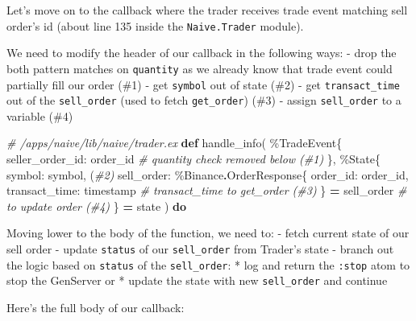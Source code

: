 \documentclass[
]{book}
\newenvironment{Shaded}{\begin{snugshade}}{\end{snugshade}}
\newcommand{\CommentTok}[1]{\textcolor[rgb]{0.56,0.35,0.01}{\textit{#1}}}
\newcommand{\ConstantTok}[1]{\textcolor[rgb]{0.00,0.00,0.00}{#1}}
\newcommand{\KeywordTok}[1]{\textcolor[rgb]{0.13,0.29,0.53}{\textbf{#1}}}
\newcommand{\NormalTok}[1]{#1}
\newcommand{\OperatorTok}[1]{\textcolor[rgb]{0.81,0.36,0.00}{\textbf{#1}}}
\newcommand{\VariableTok}[1]{\textcolor[rgb]{0.00,0.00,0.00}{#1}}
\begin{document}
Let's move on to the callback where the trader receives trade event matching sell order's id (about line 135 inside the \texttt{Naive.Trader} module).

We need to modify the header of our callback in the following ways:
- drop the both pattern matches on \texttt{quantity} as we already know that trade event could partially fill our order (\#1)
- get \texttt{symbol} out of state (\#2)
- get \texttt{transact\_time} out of the \texttt{sell\_order} (used to fetch \texttt{get\_order}) (\#3)
- assign \texttt{sell\_order} to a variable (\#4)

\begin{Shaded}
\begin{Highlighting}[]
  \CommentTok{\# /apps/naive/lib/naive/trader.ex}
  \KeywordTok{def}\NormalTok{ handle\_info(}
\NormalTok{        \%}\ConstantTok{TradeEvent}\NormalTok{\{}
          \VariableTok{seller\_order\_id:}\NormalTok{ order\_id }\CommentTok{\# \textasciigrave{}quantity\textasciigrave{} check removed below (\#1)}
\NormalTok{        \},}
\NormalTok{        \%}\ConstantTok{State}\NormalTok{\{}
          \VariableTok{symbol:}\NormalTok{ symbol, (}\CommentTok{\#2)}
          \VariableTok{sell\_order:}
\NormalTok{            \%}\ConstantTok{Binance}\OperatorTok{.}\ConstantTok{OrderResponse}\NormalTok{\{}
              \VariableTok{order\_id:}\NormalTok{ order\_id,}
              \VariableTok{transact\_time:}\NormalTok{ timestamp }\CommentTok{\# \textasciigrave{}transact\_time\textasciigrave{} to \textasciigrave{}get\_order\textasciigrave{} (\#3)}
\NormalTok{            \} }\OperatorTok{=}\NormalTok{ sell\_order }\CommentTok{\# to update order (\#4)}
\NormalTok{        \} }\OperatorTok{=}\NormalTok{ state}
\NormalTok{      ) }\KeywordTok{do}
\end{Highlighting}
\end{Shaded}

Moving lower to the body of the function, we need to:
- fetch current state of our sell order
- update \texttt{status} of our \texttt{sell\_order} from Trader's state
- branch out the logic based on \texttt{status} of the \texttt{sell\_order}:
* log and return the \texttt{:stop} atom to stop the GenServer
or
* update the state with new \texttt{sell\_order} and continue

Here's the full body of our callback:
\end{document}
